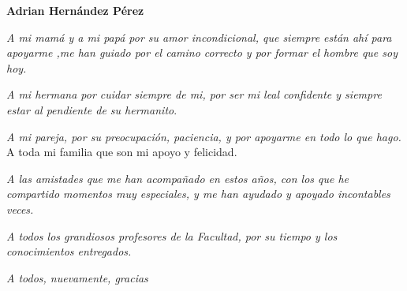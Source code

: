 \begin{acknowledgements}
	
	\begin{flushleft}
	\textbf{ {\LARGE Adrian Hernández Pérez}}
	\newline

	{\large 	\emph{A mi mamá y a mi papá por su amor incondicional, que siempre están ahí para apoyarme ,me han guiado por el camino correcto y por formar el hombre que soy hoy.}
		\newline
		
	\emph{	A mi hermana por cuidar siempre de mi, por ser mi leal confidente y siempre estar al pendiente de su hermanito}.
		\newline
		
	\emph{	A mi pareja, por su preocupación, paciencia, y por apoyarme en todo lo que hago. }
		\newline
		A toda mi familia que son mi apoyo y felicidad.
		\newline
		
	\emph{	A las amistades que me han acompañado en estos años, con los que he compartido momentos muy especiales, y me han ayudado y apoyado incontables veces.}
		\newline
		
	\emph{	A todos los grandiosos  profesores de la Facultad, por su tiempo y los conocimientos entregados.}
		\newline
		
		\emph{A todos, nuevamente, gracias}}
	\end{flushleft}


   
   
   
  
 
  
   
   
  
   
\end{acknowledgements}